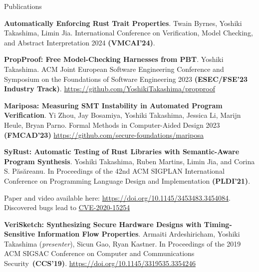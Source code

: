 \documentclass{resume} %
\begin{document}
\begin{rSection}{Publications}

  \begin{rSubsection}{}{}{}{}
  \item \textbf{Automatically Enforcing Rust Trait Properties}. Twain
    Byrnes, Yoshiki Takashima, Limin Jia. International Conference on
    Verification, Model Checking, and Abstract Interpretation 2024
    \textbf{(VMCAI’24)}.

  \item \textbf{PropProof: Free Model-Checking Harnesses from PBT}.
    Yoshiki Takashima. ACM Joint European Software Engineering
    Conference and Symposium on the Foundations of Software
    Engineering 2023 \textbf{(ESEC/FSE’23 Industry Track)}.
    {\footnotesize \href{https://github.com/YoshikiTakashima/propproof}
      {https://github.com/YoshikiTakashima/propproof}}

  \item \textbf{Mariposa: Measuring SMT Instability in Automated
      Program Verification}. Yi Zhou, Jay Bosamiya, Yoshiki Takashima,
    Jessica Li, Marijn Heule, Bryan Parno. Formal Methods in
    Computer-Aided Design 2023 \textbf{(FMCAD'23)}
    {\footnotesize \href{https://github.com/secure-foundations/mariposa}
      {https://github.com/secure-foundations/mariposa}}

  \item \textbf{SyRust: Automatic Testing of Rust Libraries
      with Semantic-Aware Program Synthesis}.
    Yoshiki Takashima, Ruben Martins, Limin Jia, and Corina
    S. P\u{a}s\u{a}reanu. In Proceedings of the 42nd
    ACM SIGPLAN International Conference on Programming Language
    Design and Implementation \textbf{(PLDI’21)}.

    {\footnotesize Paper and video available here:
      \href{https://doi.org/10.1145/3453483.3454084}
      {https://doi.org/10.1145/3453483.3454084}. Discovered bugs lead to
      \href{https://nvd.nist.gov/vuln/detail/CVE-2020-15254}{CVE-2020-15254}}

  \item \textbf{VeriSketch: Synthesizing Secure Hardware Designs with
      Timing-Sensitive Information Flow Properties}. Armaiti
    Ardeshiricham, Yoshiki Takashima (\textit{presenter}), Sicun Gao,
    Ryan Kastner. In Proceedings of the 2019 ACM SIGSAC Conference on
    Computer and Communications Security~\textbf{(CCS'19)}.
    {\footnotesize \href{https://dl.acm.org/doi/abs/10.1145/3319535.3354246}
      {https://doi.org/10.1145/3319535.3354246}}
  \end{rSubsection}
\end{rSection}
\end{document}
